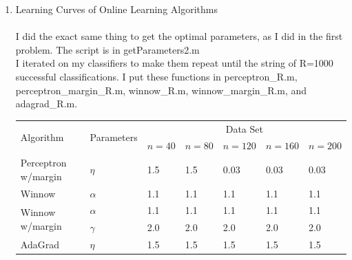 \begin{enumerate}
\item Learning Curves of Online Learning Algorithms\\\\
I did the exact same thing to get the optimal parameters, as I did in the first problem. The script is in getParameters2.m\\
I iterated on my classifiers to make them repeat until the string of R=1000 successful classifications. I put these functions in perceptron\_R.m, perceptron\_margin\_R.m, winnow\_R.m, winnow\_margin\_R.m, and adagrad\_R.m.\\
    \begin{table}[H]
    \begin{tabular}{|p{4.7cm}<{\centering}|p{2.0cm}<{\centering}|p{1.5cm}<{\centering}|p{1.5cm}<{\centering}|p{1.5cm}<{\centering}|p{1.5cm}<{\centering}|p{1.5cm}<{\centering}|}
      \hline
      \multirow{2}{*}{Algorithm} & \multirow{2}{*}{Parameters} & \multicolumn{5}{|c|}{Data Set} \\
      \cline{3-7}
 & & $n=40$& $n=80$& $n=120$& $n=160$& $n=200$\\
 \hline
      Perceptron w/margin &          $\eta$          &1.5                   &1.5     &0.03 &0.03 &0.03                              \\\hline

      Winnow               &     $\alpha$           &1.1                     &1.1         &1.1 &1.1 &1.1                          \\\hline %
      \multirow{2}{*}{Winnow w/margin}     & $\alpha$&1.1                                     &1.1     &1.1 &1.1 &1.1                \\
      \cline{2-7}
      & $\gamma$ &2.0  &2.0 &2.0 &2.0 &2.0\\ \hline %
      AdaGrad             & $\eta$&1.5                                      &1.5               &1.5 &1.5 &1.5                    \\\hline %
    \end{tabular}
    \end{table}


\end{enumerate}
